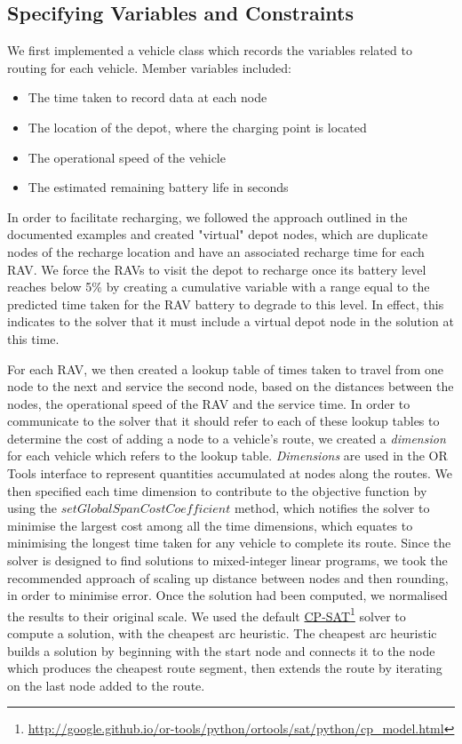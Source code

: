 \subsection{Specifying Variables and Constraints}
We first implemented a vehicle class which records the variables related to routing for each vehicle. Member variables included:
\begin{itemize}
    \item The time taken to record data at each node
    \item The location of the depot, where the charging point is located
    \item The operational speed of the vehicle
    \item The estimated remaining battery life in seconds
\end{itemize}
In order to facilitate recharging, we followed the approach outlined in the documented examples and created "virtual" depot nodes, which are duplicate nodes of the recharge location and have an associated recharge time for each RAV.  We force the RAVs to visit the depot to recharge once its battery level reaches below 5\% by creating a cumulative variable with a range equal to the predicted time taken for the RAV battery to degrade to this level. In effect, this indicates to the solver that it must include a virtual depot node in the solution at this time.

For each RAV, we then created a lookup table of times taken to travel from one node to the next and service the second node, based on the distances between the nodes, the operational speed of the RAV and the service time. In order to communicate to the solver that it should refer to each of these lookup tables to determine the cost of adding a node to a vehicle's route, we created a \textit{dimension} for each vehicle which refers to the lookup table. \textit{Dimensions} are used in the OR Tools interface to represent quantities accumulated at nodes along the routes. We then specified each time dimension to contribute to the objective function by using the $setGlobalSpanCostCoefficient$ method, which notifies the solver to minimise the largest cost among all the time dimensions, which equates to minimising the longest time taken for any vehicle to complete its route. Since the solver is designed to find solutions to mixed-integer linear programs, we took the recommended approach of scaling up distance between nodes and then rounding, in order to minimise error. Once the solution had been computed, we normalised the results to their original scale. We used the default \href{http://google.github.io/or-tools/python/ortools/sat/python/cp\_model.html}{CP-SAT}\footnote{\href {http://google.github.io/or-tools/python/ortools/sat/python/cp\_model.html}{http://google.github.io/or-tools/python/ortools/sat/python/cp\_model.html}} solver to compute a solution, with the cheapest arc heuristic. The cheapest arc heuristic builds a solution by beginning with the start node and connects it to the node which produces the cheapest route segment, then extends the route by iterating on the last node added to the route. %


